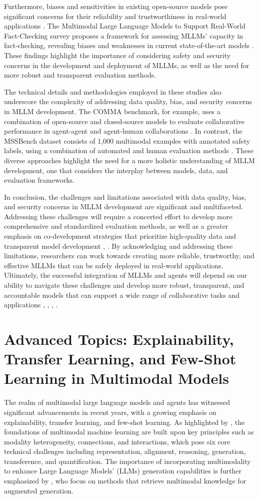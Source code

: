 \documentclass[conference]{IEEEtran}
\begin{document}
Furthermore, biases and sensitivities in existing open-source models pose significant concerns for their reliability and trustworthiness in real-world applications \cite{b6}. The Multimodal Large Language Models to Support Real-World Fact-Checking survey proposes a framework for assessing MLLMs' capacity in fact-checking, revealing biases and weaknesses in current state-of-the-art models \cite{b6}. These findings highlight the importance of considering safety and security concerns in the development and deployment of MLLMs, as well as the need for more robust and transparent evaluation methods.

The technical details and methodologies employed in these studies also underscore the complexity of addressing data quality, bias, and security concerns in MLLM development. The COMMA benchmark, for example, uses a combination of open-source and closed-source models to evaluate collaborative performance in agent-agent and agent-human collaborations \cite{b1}. In contrast, the MSSBench dataset consists of 1,000 multimodal examples with annotated safety labels, using a combination of automated and human evaluation methods \cite{b3}. These diverse approaches highlight the need for a more holistic understanding of MLLM development, one that considers the interplay between models, data, and evaluation frameworks.

In conclusion, the challenges and limitations associated with data quality, bias, and security concerns in MLLM development are significant and multifaceted. Addressing these challenges will require a concerted effort to develop more comprehensive and standardized evaluation methods, as well as a greater emphasis on co-development strategies that prioritize high-quality data and transparent model development \cite{b4}, \cite{b5}. By acknowledging and addressing these limitations, researchers can work towards creating more reliable, trustworthy, and effective MLLMs that can be safely deployed in real-world applications. Ultimately, the successful integration of MLLMs and agents will depend on our ability to navigate these challenges and develop more robust, transparent, and accountable models that can support a wide range of collaborative tasks and applications \cite{b1}, \cite{b2}, \cite{b3}, \cite{b6}.

\section{Advanced Topics: Explainability, Transfer Learning, and Few-Shot Learning in Multimodal Models}
The realm of multimodal large language models and agents has witnessed significant advancements in recent years, with a growing emphasis on explainability, transfer learning, and few-shot learning. As highlighted by \cite{b1}, the foundations of multimodal machine learning are built upon key principles such as modality heterogeneity, connections, and interactions, which pose six core technical challenges including representation, alignment, reasoning, generation, transference, and quantification. The importance of incorporating multimodality to enhance Large Language Models' (LLMs) generation capabilities is further emphasized by \cite{b2}, who focus on methods that retrieve multimodal knowledge for augmented generation.
\end{document}
